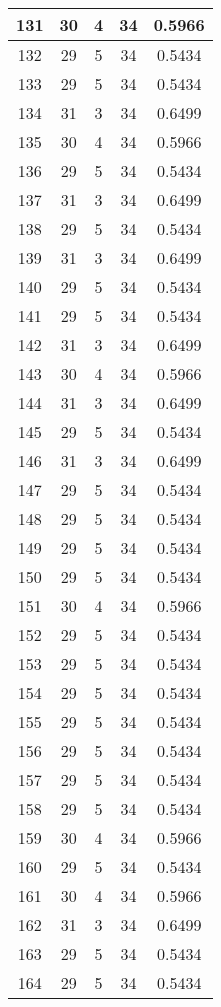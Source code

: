 \documentclass[letterpaper, 12pt]{article}
\begin{document}
\begin{longtable}{|c|c|c|c|c|}
\hline
131 & 30 & 4 & 34 & 0.5966 \\
\hline
132 & 29 & 5 & 34 & 0.5434 \\
\hline
133 & 29 & 5 & 34 & 0.5434 \\
\hline
134 & 31 & 3 & 34 & 0.6499 \\
\hline
135 & 30 & 4 & 34 & 0.5966 \\
\hline
136 & 29 & 5 & 34 & 0.5434 \\
\hline
137 & 31 & 3 & 34 & 0.6499 \\
\hline
138 & 29 & 5 & 34 & 0.5434 \\
\hline
139 & 31 & 3 & 34 & 0.6499 \\
\hline
140 & 29 & 5 & 34 & 0.5434 \\
\hline
141 & 29 & 5 & 34 & 0.5434 \\
\hline
142 & 31 & 3 & 34 & 0.6499 \\
\hline
143 & 30 & 4 & 34 & 0.5966 \\
\hline
144 & 31 & 3 & 34 & 0.6499 \\
\hline
145 & 29 & 5 & 34 & 0.5434 \\
\hline
146 & 31 & 3 & 34 & 0.6499 \\
\hline
147 & 29 & 5 & 34 & 0.5434 \\
\hline
148 & 29 & 5 & 34 & 0.5434 \\
\hline
149 & 29 & 5 & 34 & 0.5434 \\
\hline
150 & 29 & 5 & 34 & 0.5434 \\
\hline
151 & 30 & 4 & 34 & 0.5966 \\
\hline
152 & 29 & 5 & 34 & 0.5434 \\
\hline
153 & 29 & 5 & 34 & 0.5434 \\
\hline
154 & 29 & 5 & 34 & 0.5434 \\
\hline
155 & 29 & 5 & 34 & 0.5434 \\
\hline
156 & 29 & 5 & 34 & 0.5434 \\
\hline
157 & 29 & 5 & 34 & 0.5434 \\
\hline
158 & 29 & 5 & 34 & 0.5434 \\
\hline
159 & 30 & 4 & 34 & 0.5966 \\
\hline
160 & 29 & 5 & 34 & 0.5434 \\
\hline
161 & 30 & 4 & 34 & 0.5966 \\
\hline
162 & 31 & 3 & 34 & 0.6499 \\
\hline
163 & 29 & 5 & 34 & 0.5434 \\
\hline
164 & 29 & 5 & 34 & 0.5434 \\

\end{longtable}
\end{document}
